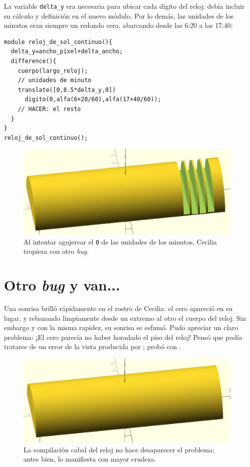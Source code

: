 La variable \lstinline!delta_y! era necesaria para ubicar cada dígito
del reloj; debía incluir su cálculo y definición en el nuevo
módulo. Por lo demás, las unidades de los minutos eran siempre un
redondo cero, abarcando desde las 6:20 a las 17:40:

\begin{lstlisting}
module reloj_de_sol_continuo(){
  delta_y=ancho_pixel+delta_ancho;
  difference(){
    cuerpo(largo_reloj);    
    // unidades de minuto
    translate([0,8.5*delta_y,0])
      digito(0,alfa(6+20/60),alfa(17+40/60));  
    // HACER: el resto
  }
}
reloj_de_sol_continuo();
\end{lstlisting}%

\begin{figure}[ht]
  \centering
  \includegraphics[width=.8\textwidth]{imagenes/unidades-minutos-bug-1}
  \caption{Al intentar agujerear el \texttt{0} de las unidades de los
    minutos, Cecilia tropieza con otro \emph{bug}.}
  \label{fig:unidades-minutos-bug-1}
\end{figure}

\section{Otro \emph{bug} y van...}


Una sonrisa brilló rápidamente en el rostro de Cecilia: el cero
apareció en su lugar, y rebanando limpiamente desde un extremo al otro
el cuerpo del reloj. Sin embargo y con la misma rapidez, su sonrisa se
esfumó. Pudo apreciar un claro problema: ¡El cero parecía no haber
horadado el piso del reloj! Pensó que podía tratarse de un error de la
vista producida por ; probó con .

\begin{figure}[ht]
  \centering
  \includegraphics[width=.75\textwidth]{imagenes/unidades-minutos-bug-2}
  \caption{La compilación cabal del reloj no hace desaparecer el
    problema; antes bien, lo manifiesta con mayor crudeza.}
  \label{fig:unidades-minutos-bug-2}
\end{figure}

